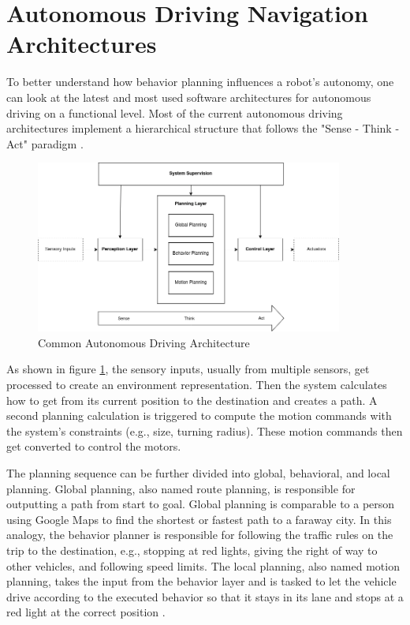 

\section{Autonomous Driving Navigation Architectures}
\label{sec:Autonomous Driving Navigation Architectures}

To better understand how behavior planning influences a robot's autonomy, one can look at the latest and most used software architectures for autonomous driving on a functional level. Most of the current autonomous driving architectures implement a hierarchical structure that follows the "Sense - Think - Act" paradigm \cite{murphy2000}. 

\begin{figure}[ht]
	\centering
	\includegraphics[width=0.9\textwidth]{images/autonomous_driving_architecture.png}
	\caption{Common Autonomous Driving Architecture \cite{brooks1986,velasco2020}}
	\label{fig:autonomous_driving_architecture}
\end{figure}

As shown in figure \ref{fig:autonomous_driving_architecture}, the sensory inputs, usually from multiple sensors, get processed to create an environment representation. Then the system calculates how to get from its current position to the destination and creates a path. A second planning calculation is triggered to compute the motion commands with the system's constraints (e.g., size, turning radius). These motion commands then get converted to control the motors. 

The planning sequence can be further divided into global, behavioral, and local planning. Global planning, also named route planning, is responsible for outputting a path from start to goal. Global planning is comparable to a person using Google Maps to find the shortest or fastest path to a faraway city. In this analogy, the behavior planner is responsible for following the traffic rules on the trip to the destination, e.g., stopping at red lights, giving the right of way to other vehicles, and following speed limits. The local planning, also named motion planning, takes the input from the behavior layer and is tasked to let the vehicle drive according to the executed behavior so that it stays in its lane and stops at a red light at the correct position \cite{reke2020}.


